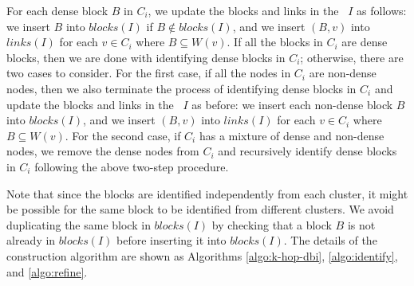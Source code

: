 For each dense block $B$ in $C_i$,
we update the blocks and links in the \DBIndex\ $I$ as follows:
we insert $B$ into $blocks(I)$ if $B \not\in blocks(I)$,
and we insert $(B,v)$ into $links(I)$
for each $v \in C_i$ where $B \subseteq W(v)$.
If all the blocks in $C_i$ are dense blocks, then we are done with identifying dense blocks in $C_i$;
otherwise, there are two cases to consider.
For the first case, if all the nodes in $C_i$ are non-dense nodes,
then we also terminate the process  of identifying dense blocks in $C_i$
and update the blocks and links in the \DBIndex\ $I$ as before:
we insert each non-dense block $B$ into $blocks(I)$,
and we insert $(B,v)$ into $links(I)$ for each $v \in C_i$ where $B \subseteq W(v)$.
For the second case, if $C_i$ has a mixture of dense and non-dense nodes,
we remove the dense nodes from $C_i$ and recursively identify dense blocks in $C_i$
following the above two-step procedure.

Note that since the blocks are identified independently from each cluster,
it might be possible for the same block to be identified from different clusters.
We avoid duplicating the same block in $blocks(I)$ by checking that a block $B$ is not already in $blocks(I)$
before inserting it into $blocks(I)$.
The details of the construction algorithm are shown as Algorithms
\ref{algo:k-hop-dbi},
\ref{algo:identify},
and
\ref{algo:refine}.


